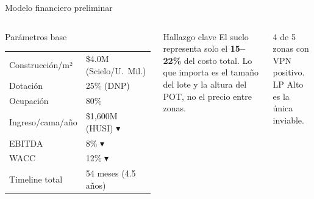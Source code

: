 \documentclass[aspectratio=169, 11pt]{beamer}
\begin{document}
\begin{frame}{Modelo financiero preliminar}
\begin{columns}[T]
\begin{block}{\small Parámetros base}
\scriptsize
\begin{tabular}{@{}ll@{}}
Construcción/m² & \$4.0M {\tiny(Scielo/U.\ Mil.)} \\
Dotación & 25\% {\tiny(DNP)} \\
Ocupación & 80\% \\
Ingreso/cama/año & \$1,600M {\tiny(HUSI)} {\color{coral}$\blacktriangledown$} \\
EBITDA & 8\% {\color{coral}$\blacktriangledown$} \\
WACC & 12\% {\color{coral}$\blacktriangledown$} \\
Timeline total & 54 meses (4.5 años) \\
\end{tabular}
\end{block}

\vspace{2pt}
\begin{exampleblock}{\small Hallazgo clave}
\scriptsize El suelo representa solo el \textbf{15--22\%} del costo total. Lo que importa es el tamaño del lote y la altura del POT, no el precio entre zonas.
\end{exampleblock}

\vspace{1pt}
{\scriptsize\textcolor{slate}{4 de 5 zonas con VPN positivo. LP Alto es la única inviable.}}
\end{columns}
\end{frame}
\end{document}
